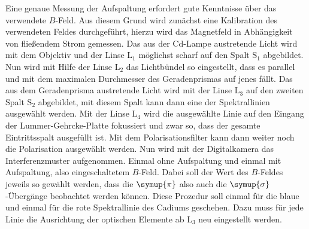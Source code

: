 Eine genaue Messung der Aufspaltung erfordert gute Kenntnisse über das verwendete $B$-Feld.
Aus diesem Grund wird zunächst eine Kalibration des verwendeten Feldes durchgeführt, hierzu wird das
Magnetfeld in Abhängigkeit von fließendem Strom gemessen. 
Das aus der Cd-Lampe austretende Licht wird mit dem Objektiv und der Linse $\text{L}_1$ möglichst
scharf auf den Spalt $\text{S}_1$ abgebildet.
Nun wird mit Hilfe der Linse $\text{L}_2$ das Lichtbündel so eingestellt, dass es parallel und mit dem maximalen
Durchmesser des Geradenprismas auf jenes fällt. Das aus dem Geradenprisma austretende Licht wird mit der 
Linse $\text{L}_3$ auf den zweiten Spalt $\text{S}_2$ abgebildet, mit diesem Spalt kann dann eine der Spektrallinien
ausgewählt werden. Mit der Linse $\text{L}_4$ wird die ausgewählte Linie auf den Eingang der Lummer-Gehrcke-Platte
fokussiert und zwar so, dass der gesamte Eintrittsspalt ausgefüllt ist. 
Mit dem Polarisationsfilter kann dann weiter noch die Polarisation ausgewählt werden. Nun wird 
mit der Digitalkamera das Interferenzmuster aufgenommen. Einmal ohne Aufspaltung und einmal 
mit Aufspaltung, also eingeschaltetem $B$-Feld. Dabei soll der Wert des $B$-Feldes jeweils so
gewählt werden, dass die $\symup{\pi}$ also auch die $\symup{\sigma}$-Übergänge beobachtet werden können.
Diese Prozedur soll einmal für die blaue und einmal für die rote Spektrallinie des Cadiums geschehen.
Dazu muss für jede Linie die Ausrichtung der optischen Elemente ab $\text{L}_3$ neu eingestellt werden.
\FloatBarrier